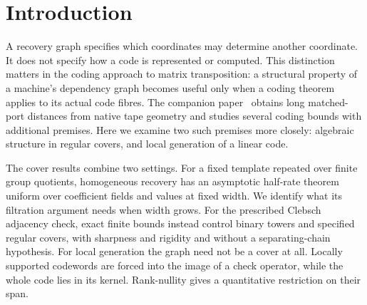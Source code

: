 \section{Introduction}\label{sec:introduction}

A recovery graph specifies which coordinates may determine another
coordinate. It does not specify how a code is represented or computed.
This distinction matters in the coding approach to matrix transposition:
a structural property of a machine's dependency graph becomes useful
only when a coding theorem applies to its actual code fibres.
The companion paper~\cite{BrendeDirected} obtains long matched-port
distances from native tape geometry and studies several coding bounds
with additional premises. Here we examine two such premises more closely:
algebraic structure in regular covers, and local generation of a linear code.

The cover results combine two settings. For a fixed template repeated
over finite group quotients, homogeneous recovery has an asymptotic
half-rate theorem uniform over coefficient fields and values at fixed
width. We identify what its filtration argument needs when width grows.
For the prescribed Clebsch adjacency check, exact finite bounds instead
control binary towers and specified regular covers, with sharpness and
rigidity and without a separating-chain hypothesis. For local generation
the graph need not be a cover at all. Locally supported codewords
are forced into the image of a check operator, while the whole code lies
in its kernel. Rank-nullity gives a quantitative restriction on their span.

